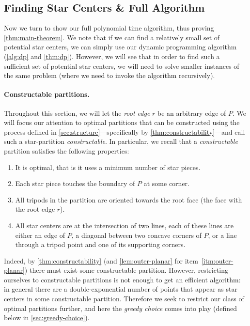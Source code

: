 \documentclass[10pt,a4paper]{article}
\begin{document}
\subsection{Finding Star Centers \& Full Algorithm}
\label{sec:full-algo}

Now we turn to show our full polynomial time algorithm, thus proving \cref{thm:main-theorem}. We note that if we can find a relatively small set of potential star centers, we can simply use our dynamic programming algorithm (\cref{alg:dp} and \cref{thm:dp}). However, we will see that in order to find such a sufficient set of potential star centers, we will need to solve smaller instances of the same problem (where we need to invoke the algorithm recursively).


\paragraph{Constructable partitions.}
Throughout this section, we will let the \emph{root edge} $r$ be an arbitrary edge of $P$. We will focus our attention to optimal partitions that can be constructed using the process defined in \cref{sec:structure}---specifically by \cref{thm:constructability}---and call such a star-partition \emph{constructable}. In particular, we recall that a \emph{constructable} partition satisfies the following properties:
\begin{enumerate}[label=(\roman*)]
    \item\label{itm:consti} It is optimal, that is it uses a minimum number of star pieces.
    \item\label{itm:outer-planar} Each star piece touches the boundary of $P$ at some corner.
    \item All tripods in the partition are oriented towards the root face (the face with the root edge $r$).
    \item\label{itm:constiv} All star centers are at the intersection of two lines, each of these lines are either an edge of $P$, a diagonal between two concave corners of $P$, or a line through a tripod point and one of its supporting corners. 
\end{enumerate}
Indeed, by \cref{thm:constructability} (and \cref{lem:outer-planar} for item~\ref{itm:outer-planar}) there must exist some constructable partition. However, restricting ourselves to constructable partitions is not enough to get an efficient algorithm: in general there are a double-exponential number of points that appear as star centers in some constructable partition. Therefore we seek to restrict our class of optimal partitions further, and here the \emph{greedy choice} comes into play (defined below in \cref{sec:greedy-choice}).
\end{document}
